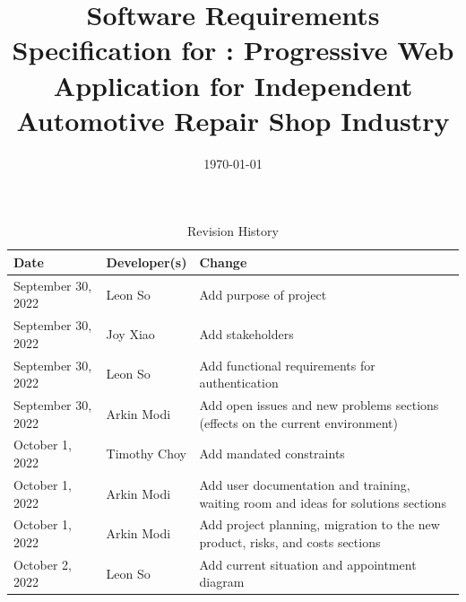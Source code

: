 \documentclass[12pt]{article}
\begin{document}
\title{Software Requirements Specification for \progname: Progressive Web Application for Independent
	Automotive Repair Shop Industry}
\author{\authname}
\date{\today}

\maketitle

\newpage


\tableofcontents

\newpage

\listoftables

\listoffigures

\newpage

\begin{longtable}{p{} p{} p{}}
	\caption{Revision History} \label{TblRevisionHistory}                                                                           \\
	\toprule
	\textbf{Date}      & \textbf{Developer(s)} & \textbf{Change}                                                                    \\
	\midrule
	September 30, 2022 & Leon So               & Add purpose of project                                                             \\
	September 30, 2022 & Joy Xiao              & Add stakeholders                                                                   \\
	September 30, 2022 & Leon So               & Add functional requirements for authentication                                     \\
	September 30, 2022 & Arkin Modi            & Add open issues and new problems sections (effects on the current environment)     \\
	October 1, 2022    & Timothy Choy          & Add mandated constraints                                                           \\
	October 1, 2022    & Arkin Modi            & Add user documentation and training, waiting room and ideas for solutions sections \\
	October 1, 2022    & Arkin Modi            & Add project planning, migration to the new product, risks, and costs sections      \\
	October 2, 2022    & Leon So               & Add current situation and appointment diagram                                      \\

\end{longtable}
\end{document}
